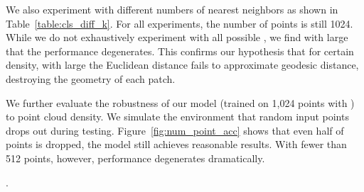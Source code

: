 \documentclass[acmtog]{acmart}
\begin{document}
We also experiment with different numbers  of nearest neighbors as shown in Table~\ref{table:cls_diff_k}. For all experiments, the number of points is still 1024. While we do not exhaustively experiment with all possible , we find with large  that the performance degenerates. This confirms  our hypothesis that for certain density, with large  the Euclidean distance fails to approximate geodesic distance, destroying the geometry of each patch.

We further evaluate the robustness of our model (trained on 1,024 points with ) to point cloud density. We simulate the environment that random input points drops out during testing. Figure~\ref{fig:num_point_acc} shows that even half of points is dropped, the model still achieves reasonable results. With fewer than 512 points, however, performance degenerates dramatically. 

\begin{table}[H]
\vskip 0.1in
\begin{center}
\end{center}
\caption{Effectiveness of different components. CENT denotes centralization, DYN denotes dynamical graph recomputation, and MPOINTS denotes experiments with 2048 points}.
\label{table:cls_eff}
\end{table}

\begin{table}[H]
\vskip 0.1in
\begin{center}
\end{center}
\caption{Results of our model with different numbers of nearest neighbors.}
\label{table:cls_diff_k}
\end{table}
\end{document}
